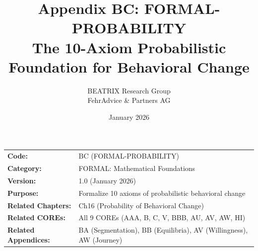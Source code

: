 \documentclass[11pt, a4paper]{article}
\title{Appendix BC: FORMAL-PROBABILITY\\
The 10-Axiom Probabilistic Foundation for Behavioral Change}
\author{BEATRIX Research Group \\ FehrAdvice \& Partners AG}
\date{January 2026}
\begin{document}
\maketitle


\begin{tcolorbox}[colback=gray!10!white, colframe=gray!75!black, title=Appendix Metadata]
\begin{tabular}{@{}ll@{}}
\textbf{Code:} & BC (FORMAL-PROBABILITY) \\
\textbf{Category:} & FORMAL: Mathematical Foundations \\
\textbf{Version:} & 1.0 (January 2026) \\
\textbf{Purpose:} & Formalize 10 axioms of probabilistic behavioral change \\
\textbf{Related Chapters:} & Ch16 (Probability of Behavioral Change) \\
\textbf{Related COREs:} & All 9 COREs (AAA, B, C, V, BBB, AU, AV, AW, HI) \\
\textbf{Related Appendices:} & BA (Segmentation), BB (Equilibria), AV (Willingness), AW (Journey) \\
\end{tabular}
\end{tcolorbox}

\end{document}
